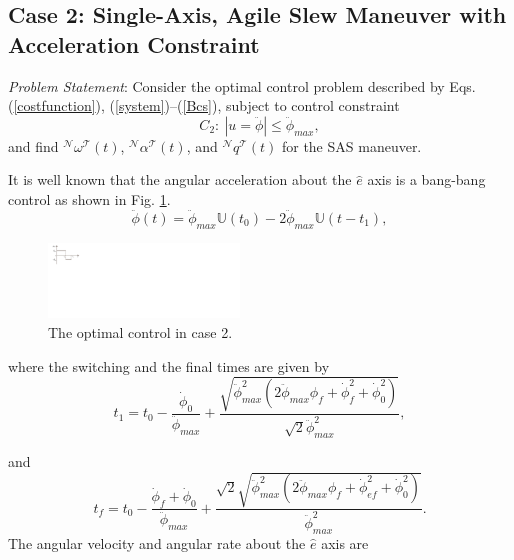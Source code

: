 \documentclass[letterpaper, paper,12pt]{AAS}		%
\begin{document}
	\subsection{Case 2: Single-Axis, Agile Slew Maneuver with Acceleration Constraint} 
	
	{\it Problem Statement}: Consider the optimal control problem described by Eqs. (\ref{costfunction}), (\ref{system})--(\ref{Bcs}), subject to control constraint
	\begin{equation}
	C_2: \ |u=\ddot{\phi}|\leq \ddot{\phi}_{max},
	\end{equation}
	and find $^\mathcal{N}\omega^\mathcal{T}(t)$, $^\mathcal{N}\alpha^\mathcal{T}(t)$, and $^\mathcal{N}q^\mathcal{T}(t)$ for the SAS maneuver.
	
	
	 It is well known that the angular acceleration about the $\hat{e}$ axis is a bang-bang control as shown in Fig. \ref{bang_bang}.
	\begin{equation}\label{alpha}
	\ddot{\phi}(t)=\ddot{\phi}_{max}\mathbb{U}(t_0)- 2\ddot{\phi}_{max}\mathbb{U}(t-t_1),
	\end{equation}
	
	\begin{figure}[!ht]
	\begin{center}
	\includegraphics[width=2in]{./Figures/Bang_bang}    
	\caption{The optimal control in case 2.}  
	\label{bang_bang}
	\end{center}
	\end{figure}
	where the switching and the final times are given by
	\begin{equation}
	t_1=t_0-\frac{\dot{\phi}_{0}}{\ddot{\phi}_{max}}+\frac{\sqrt{\ddot{\phi}_{max}^2(2\ddot{\phi}_{max}\phi_{f}+\dot{\phi}_{f}^2+\dot{\phi}_{0}^2)}}{\sqrt{2}\ddot{\phi}_{max}^2},
	\end{equation}
	
	
	and
	\begin{equation}
	t_f=t_0-\frac{\dot{\phi}_{f}+\dot{\phi}_{0}}{\ddot{\phi}_{max}}+\frac{\sqrt{2}\sqrt{\ddot{\phi}_{max}^2(2\ddot{\phi}_{max}\phi_{f}+\dot{\phi}_{ef}^2+\dot{\phi}_{0}^2)}}{\ddot{\phi}_{max}^2}.
	\end{equation}
The angular velocity and angular rate about the $\hat{e}$ axis are
\end{document}
